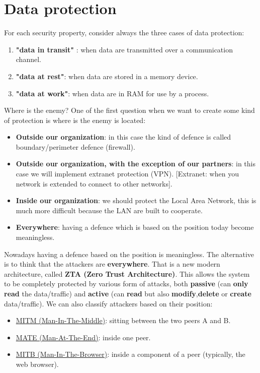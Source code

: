 \section{Data protection}
For each security property, consider always the three cases of data protection:
\begin{enumerate}
    \item \textbf{"data in transit"} : when data are transmitted over a communication channel. 
    \item \textbf{"data at rest"}: when data are stored in a memory device.
    \item \textbf{"data at work"}: when data are in RAM for use by a process.
\end{enumerate}
\begin{quotebox}[colframe=blue!10!white, colback=blue!5!white]{Where is the enemy?}
    One of the first question when we want to create some kind of protection is where is the enemy is located:
    \begin{itemize}
        \item \textbf{Outside our organization}: in this case the kind of defence is called boundary/perimeter defence (firewall).
        \item \textbf{Outside our organization, with the exception of our partners}: in this case we will implement extranet protection (VPN). [Extranet: when you network is extended to connect to other networks].
        \item \textbf{Inside our organization}: we should protect the Local Area Network, this is much more difficult because the LAN are built to cooperate. 
        \item \textbf{Everywhere}: having a defence which is based on the position today become meaningless.    
    \end{itemize}
\end{quotebox}
Nowadays having a defence based on the position is meaningless. The alternative is to think that the attackers are \textbf{everywhere}. That is a new modern architecture, called \textbf{ZTA (Zero Trust Architecture)}. This allows the system to be completely protected by various form of attacks, both \textbf{passive} (can \textbf{only read} the data/traffic) and \textbf{active} (can \textbf{read} but also \textbf{modify},\textbf{delete} or \textbf{create} data/traffic). We can also classify attackers based on their position:
\begin{itemize}
    \item \underline{MITM (Man-In-The-Middle)}: sitting between the two peers A and B.
    \item \underline{MATE (Man-At-The-End)}: inside one peer.
    \item \underline{MITB (Man-In-The-Browser)}: inside a component of a peer (typically, the web browser).   
\end{itemize}

